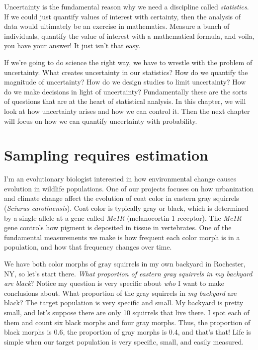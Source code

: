 \documentclass[
]{book}
\begin{document}
Uncertainty is the fundamental reason why we need a discipline called \emph{statistics}. If we could just quantify values of interest with certainty, then the analysis of data would ultimately be an exercise in mathematics. Measure a bunch of individuals, quantify the value of interest with a mathematical formula, and voila, you have your answer! It just isn't that easy.

If we're going to do science the right way, we have to wrestle with the problem of uncertainty. What creates uncertainty in our statistics? How do we quantify the magnitude of uncertainty? How do we design studies to limit uncertainty? How do we make decisions in light of uncertainty? Fundamentally these are the sorts of questions that are at the heart of statistical analysis. In this chapter, we will look at how uncertainty arises and how we can control it. Then the next chapter will focus on how we can quantify uncertainty with probability.

\section{Sampling requires estimation}\label{sampling-requires-estimation}

I'm an evolutionary biologist interested in how environmental change causes evolution in wildlife populations. One of our projects focuses on how urbanization and climate change affect the evolution of coat color in eastern gray squirrels (\emph{Sciurus carolinensis}). Coat color is typically gray or black, which is determined by a single allele at a gene called \emph{Mc1R} (melanocortin-1 receptor). The \emph{Mc1R} gene controls how pigment is deposited in tissue in vertebrates. One of the fundamental measurements we make is how frequent each color morph is in a population, and how that frequency changes over time.

We have both color morphs of gray squirrels in my own backyard in Rochester, NY, so let's start there. \emph{What proportion of eastern gray squirrels in my backyard are black}? Notice my question is very specific about \emph{who} I want to make conclusions about. What proportion of the gray squirrels in \emph{my backyard} are black? The target population is very specific and small. My backyard is pretty small, and let's suppose there are only 10 squirrels that live there. I spot each of them and count six black morphs and four gray morphs. Thus, the proportion of black morphs is 0.6, the proportion of gray morphs is 0.4, and that's that! Life is simple when our target population is very specific, small, and easily measured.
\end{document}
